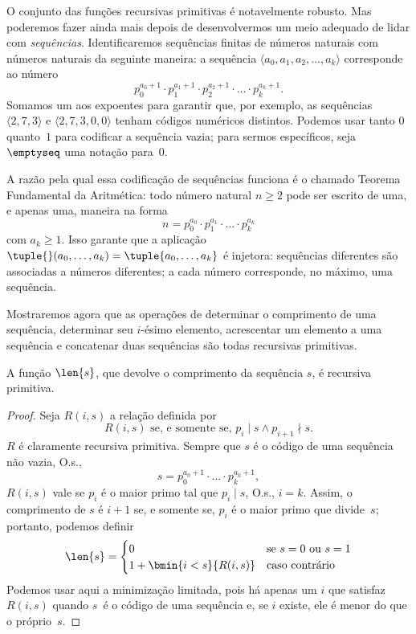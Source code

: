 \documentclass[../../../include/open-logic-section]{subfiles}
\begin{document}

O conjunto das funções recursivas primitivas é notavelmente robusto.
Mas poderemos fazer ainda mais depois de desenvolvermos um meio adequado
de lidar com \emph{sequências}. Identificaremos sequências finitas de
números naturais com números naturais da seguinte maneira: a sequência
$\langle a_0, a_1, a_2, \dots, a_k \rangle$ corresponde ao número
\[
p_0^{a_0+1} \cdot p_1^{a_1+1} \cdot p_2^{a_2+1} \cdot \dots \cdot
p_k^{a_k+1}.
\]
Somamos um aos expoentes para garantir que, por exemplo, as sequências
$\langle 2, 7, 3\rangle$ e $\langle 2, 7, 3, 0, 0 \rangle$ tenham
códigos numéricos distintos. Podemos usar tanto $0$ quanto~$1$ para
codificar a sequência vazia; para sermos específicos, seja $\emptyseq$
uma notação para~$0$.

A razão pela qual essa codificação de sequências funciona é o chamado
Teorema Fundamental da Aritmética: todo número natural $n \ge 2$ pode
ser escrito de uma, e apenas uma, maneira na forma
\[
n = p_0^{a_0} \cdot p_1^{a_1} \cdot \dots \cdot p_k^{a_k}
\]
com $a_k \ge 1$. Isso garante que a aplicação $\tuple{}(a_0,
\dots, a_k) = \tuple{a_0, \dots, a_k}$ é injetora: sequências
diferentes são associadas a números diferentes; a cada número
corresponde, no máximo, uma sequência.

Mostraremos agora que as operações de determinar o comprimento de uma
sequência, determinar seu $i$-ésimo elemento, acrescentar um elemento a
uma sequência e concatenar duas sequências são todas recursivas primitivas.

\begin{prop}
  A função $\len{s}$, que devolve o comprimento da sequência
  $s$, é recursiva primitiva.
\end{prop}

\begin{proof}
  Seja $R(i, s)$ a relação definida por
  \[
  R(i, s) \text{ se, e somente se, }
  p_i \mid s \land p_{i+1} \nmid s.
  \]
  $R$ é claramente recursiva primitiva. Sempre que $s$ é o código de
  uma sequência não vazia, O.s.\@,
  \[
  s = p_0^{a_0+1} \cdot \dots \cdot p_{k}^{a_{k}+1},
  \]
  $R(i,s)$ vale se $p_i$ é o maior primo tal que
  $p_i \mid s$, O.s.\@, $i = k$. Assim, o comprimento de $s$ é $i+1$
  se, e somente se, $p_i$ é o maior primo que divide~$s$; portanto,
  podemos definir
  \[
  \len{s} =
  \begin{cases}
    0 & \text{se $s = 0$ ou $s = 1$} \\
    1 + \bmin{i < s}{R(i, s)} & \text{caso contrário}
  \end{cases}
  \]
  Podemos usar aqui a minimização limitada, pois há apenas um $i$ que
  satisfaz $R(i,s)$ quando $s$~é o código de uma sequência e, se $i$
  existe, ele é menor do que o próprio~$s$.
\end{proof}
\end{document}
